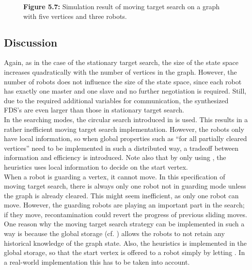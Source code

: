 \begin{figure}[p!]
\centering
	\setcounter{subfigure}{12}
	\caption*{{\bf Figure 5.7:} Simulation result of moving target search on a graph with five vertices and three robots.}
\end{figure}



\subsection{Discussion}


Again, as in the case of the stationary target search, the size of the state space increases quadratically with the number of vertices in the graph. However, the number of robots does not influence the size of the state space, since each robot has exactly one master and one slave and no further negotiation is required. Still, due to the required additional variables for communication, the synthesized FDS's are even larger than those in stationary target search.\\

In the searching modes, the circular search introduced in  is used. This results in a rather inefficient moving target search implementation. However, the robots only have local information, so when global properties such as ``for all partially cleared vertices'' need to be implemented in such a distributed way, a tradeoff between information and efficiency is introduced. Note also that by only using , the heuristics  uses local information to decide on the start vertex.\\

When a robot is guarding a vertex, it cannot move. In this specification of moving target search, there is always only one robot not in guarding mode unless the graph is already cleared. This might seem inefficient, as only one robot can move. However, the guarding robots are playing an important part in the search; if they move, recontamination could revert the progress of previous sliding moves.\\

One reason why the moving target search strategy can be implemented in such a way is because the global storage (cf. ) allows the robots to not retain any historical knowledge of the graph state. Also, the heuristics  is implemented in the global storage, so that the start vertex is offered to a robot  simply by letting . In a real-world implementation this has to be taken into account.\\
